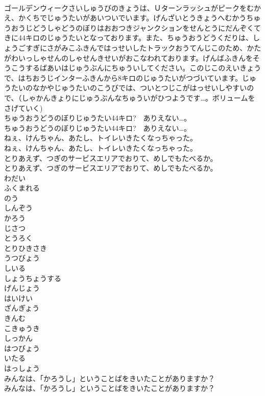 \documentclass[8pt]{extreport}
\begin{document}
\begin{CJK}{UTF8}{min}
\\	ゴールデンウィークさいしゅうびのきょうは、Ｕターンラッシュがピークをむかえ、かくちでじゅうたいがあいついでいます。げんざいとうきょうへむかうちゅうおうじどうしゃどうのぼりはおおつきジャンクションをせんとうにだんぞくてきに44キロのじゅうたいとなっております。また、ちゅうおうどうくだりは、しょうごすぎにさがみこふきんではっせいしたトラックおうてんじこのため、かたがわいっしゃせんのしゃせんきせいがおこなわれております。げんばふきんをそうこうするばあいはじゅうぶんにちゅういしてください。このじこのえいきょうで、はちおうじインターふきんから8キロのじゅうたいがつづいています。じゅうたいのなかやじゅうたいのこうびでは、ついとつじこがはっせいしやすいので、（しゃかんきょりにじゅうぶんなちゅういがひつようです…。ボリュームをさげていく)
\\	ちゅうおうどうのぼりじゅうたい44キロ?　ありえない…。
\\	ちゅうおうどうのぼりじゅうたい44キロ?　ありえない…。
\\	ねぇ、けんちゃん、あたし、トイレいきたくなっちゃった。
\\	ねぇ、けんちゃん、あたし、トイレいきたくなっちゃった。
\\	とりあえず、つぎのサービスエリアでおりて、めしでもたべるか。
\\	とりあえず、つぎのサービスエリアでおりて、めしでもたべるか。
\\	わだい
\\	ふくまれる
\\	のう
\\	しんぞう
\\	かろう
\\	じさつ
\\	とうろく
\\	とりひきさき
\\	うつびょう
\\	しいる
\\	しょうちょうする
\\	げんじょう
\\	はいけい
\\	ざんぎょう
\\	きんむ
\\	こきゅうき
\\	しっかん
\\	はつびょう
\\	いたる
\\	はっしょう
\\	みんなは、「かろうし」ということばをきいたことがありますか？
\\	みんなは、「かろうし」ということばをきいたことがありますか？

\end{CJK}
\end{document}
